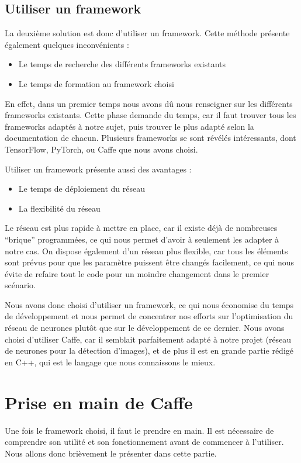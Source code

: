 \documentclass[a4paper,12pt]{article}
\begin{document}
  \subsection{Utiliser un framework}
    La deuxième solution est donc d'utiliser un framework. Cette méthode présente également quelques inconvénients : 
    \begin{itemize}
      \item Le temps de recherche des différents frameworks existants
      \item Le temps de formation au framework choisi
    \end{itemize}

    En effet, dans un premier temps nous avons dû nous renseigner sur les différents frameworks existants. Cette phase demande du temps, car il faut trouver tous les frameworks adaptés à notre sujet, puis trouver le plus adapté selon la documentation de chacun. Plusieurs frameworks se sont révélés intéressants, dont TensorFlow, PyTorch, ou Caffe que nous avons choisi.

    Utiliser un framework présente aussi des avantages :
    \begin{itemize}
      \item Le temps de déploiement du réseau
      \item La flexibilité du réseau
    \end{itemize}

    Le réseau est plus rapide à mettre en place, car il existe déjà de nombreuses ``brique'' programmées, ce qui nous permet d'avoir à seulement les adapter à notre cas. On dispose également d'un réseau plus flexible, car tous les éléments sont prévus pour que les paramètre puissent être changés facilement, ce qui nous évite de refaire tout le code pour un moindre changement dans le premier scénario.

    Nous avons donc choisi d'utiliser un framework, ce qui nous économise du temps de développement et nous permet de concentrer nos efforts sur l'optimisation du réseau de neurones plutôt que sur le développement de ce dernier. Nous avons choisi d'utiliser Caffe, car il semblait parfaitement adapté à notre projet (réseau de neurones pour la détection d'images), et de plus il est en grande partie rédigé en C++, qui est le langage que nous connaissons le mieux.

\newpage
\section{Prise en main de Caffe}
  Une fois le framework choisi, il faut le prendre en main. Il est nécessaire de comprendre son utilité et son fonctionnement avant de commencer à l'utiliser. Nous allons donc brièvement le présenter dans cette partie.
  
\end{document}
